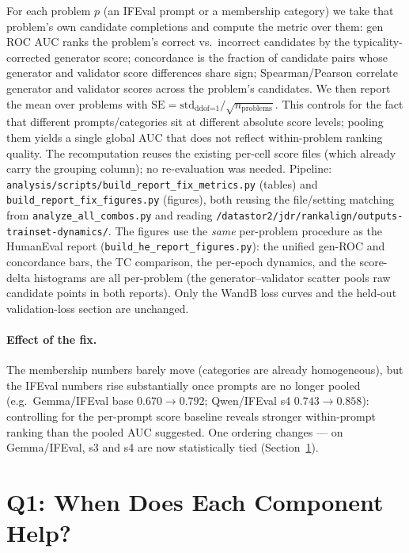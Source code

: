 \documentclass[11pt,a4paper]{article}
\begin{document}
For each problem $p$ (an IFEval prompt or a membership category) we take that problem's own
candidate completions and compute the metric over them: gen ROC AUC ranks the problem's correct
vs.\ incorrect candidates by the typicality-corrected generator score; concordance is the fraction
of candidate pairs whose generator and validator score differences share sign; Spearman/Pearson
correlate generator and validator scores across the problem's candidates. We then report the mean
over problems with $\textrm{SE}=\textrm{std}_{\textrm{ddof=1}}/\sqrt{n_{\textrm{problems}}}$. This
controls for the fact that different prompts/categories sit at different absolute score levels;
pooling them yields a single global AUC that does not reflect within-problem ranking quality. The
recomputation reuses the existing per-cell score files (which already carry the grouping column);
no re-evaluation was needed. Pipeline: \texttt{analysis/scripts/build\_report\_fix\_metrics.py}
(tables) and \texttt{build\_report\_fix\_figures.py} (figures), both reusing the file/setting
matching from \texttt{analyze\_all\_combos.py} and reading
\texttt{/datastor2/jdr/rankalign/outputs-trainset-dynamics/}. The figures use the \emph{same}
per-problem procedure as the HumanEval report (\texttt{build\_he\_report\_figures.py}): the
unified gen-ROC and concordance bars, the TC comparison, the per-epoch dynamics, and the
score-delta histograms are all per-problem (the generator--validator scatter pools raw candidate
points in both reports). Only the WandB loss curves and the held-out validation-loss section are
unchanged.

\paragraph{Effect of the fix.} The membership numbers barely move (categories are already
homogeneous), but the IFEval numbers rise substantially once prompts are no longer pooled (e.g.\
Gemma/IFEval base $0.670\!\to\!0.792$; Qwen/IFEval s4 $0.743\!\to\!0.858$): controlling for the
per-prompt score baseline reveals stronger within-prompt ranking than the pooled AUC suggested. One
ordering changes --- on Gemma/IFEval, s3 and s4 are now statistically tied (Section~\ref{sec:q1}).

\tableofcontents
\newpage

\section{Q1: When Does Each Component Help?}
\label{sec:q1}
\end{document}
